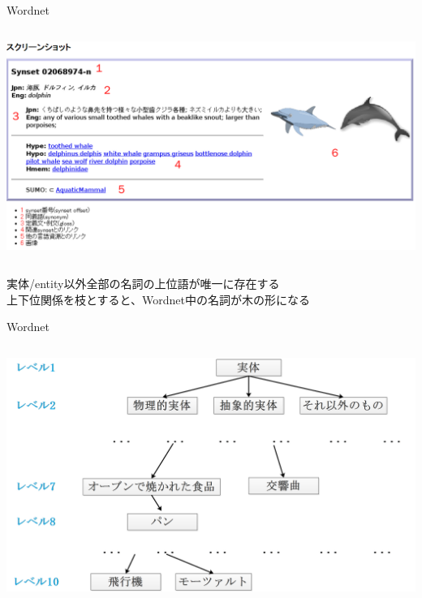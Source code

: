 \documentclass[14pt,xcolor=dvipsnames,table,dvipdfmx]{beamer}
\begin{document}
\begin{frame}{Wordnet}
\fontsize{12pt}{7.2}\selectfont
	\begin{columns}[t]
		\begin{column}{1.0\textwidth} %
			\includegraphics[width=\columnwidth]{photo14.png}
		\end{column}
	\end{columns}
	\begin{block}{}
		実体/entity以外全部の名詞の上位語が唯一に存在する \\
		上下位関係を枝とすると、Wordnet中の名詞が木の形になる
	\end{block}
\end{frame}

\begin{frame}{Wordnet}
	\begin{columns}[t]
		\begin{column}{1.0\textwidth} %
			\includegraphics[width=\columnwidth]{rk15.png}
		\end{column}
	\end{columns}
\end{frame}
\end{document}
